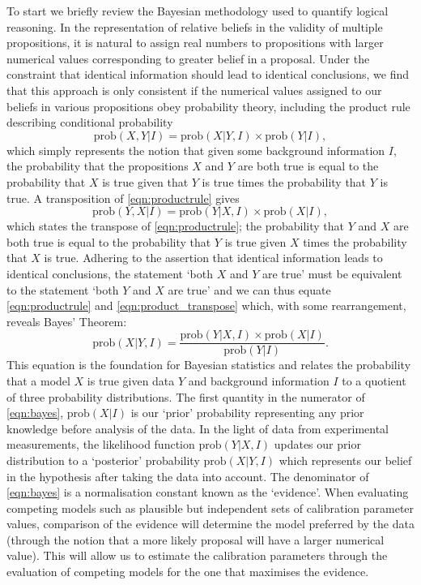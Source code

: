 To start we briefly review the Bayesian methodology used to quantify logical reasoning. In the representation of relative beliefs in the validity of multiple propositions, it is natural to assign real numbers to propositions with larger numerical values corresponding to greater belief in a proposal. Under the constraint that identical information should lead to identical conclusions, we find that this approach is only consistent if the numerical values assigned to our beliefs in various propositions obey probability theory, including the product rule describing conditional probability \citep{sivia_skilling}
\begin{equation}
    \mathrm{prob}(X,Y|I) = \mathrm{prob}(X|Y,I) \times \mathrm{prob}(Y|I),
    \label{eqn:productrule}
\end{equation}
which simply represents the notion that given some background information $I$, the probability that the propositions $X$ and $Y$ are both true is equal to the probability that $X$ is true given that $Y$ is true times the probability that $Y$ is true. A transposition of \cref{eqn:productrule} gives
\begin{equation}
    \mathrm{prob}(Y,X|I) = \mathrm{prob}(Y|X,I) \times \mathrm{prob}(X|I),
    \label{eqn:product_transpose}
\end{equation}
which states the transpose of \cref{eqn:productrule}; the probability that $Y$ and $X$ are both true is equal to the probability that $Y$ is true given $X$ times the probability that $X$ is true. Adhering to the assertion that identical information leads to identical conclusions, the statement ‘both $X$ and $Y$ are true’ must be equivalent to the statement ‘both $Y$ and $X$ are true’ and we can thus equate \cref{eqn:productrule} and \cref{eqn:product_transpose} which, with some rearrangement, reveals Bayes' Theorem:
\begin{equation}
    \mathrm{prob}(X|Y,I) = \frac{\mathrm{prob}(Y|X,I) \times \mathrm{prob}(X|I)}{\mathrm{prob}(Y|I)}.
    \label{eqn:bayes}
\end{equation}
This equation is the foundation for Bayesian statistics and relates the probability that a model $X$ is true given data $Y$ and background information $I$ to a quotient of three probability distributions. The first quantity in the numerator of \cref{eqn:bayes}, $\mathrm{prob}(X|I)$ is our ‘prior’ probability representing any prior knowledge before analysis of the data. In the light of data from experimental measurements, the likelihood function $\mathrm{prob}(Y|X,I)$ updates our prior distribution to a ‘posterior’ probability $\mathrm{prob}(X|Y,I)$ which represents our belief in the hypothesis after taking the data into account. The denominator of \cref{eqn:bayes} is a normalisation constant known as the ‘evidence’. When evaluating competing models such as plausible but independent sets of calibration parameter values, comparison of the evidence will determine the model preferred by the data (through the notion that a more likely proposal will have a larger numerical value). This will allow us to estimate the calibration parameters through the evaluation of competing models for the one that maximises the evidence.


